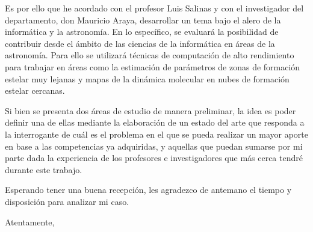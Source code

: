 \documentclass{letter} %
\begin{document}
\begin{letter}
\noindent Es por ello que he acordado con el profesor Luis Salinas y
con el investigador del departamento, don Mauricio Araya, desarrollar
un tema bajo el alero de la informática y la astronomía. En lo específico, se evaluará la posibilidad de contribuir desde el ámbito de las ciencias de la informática en áreas de la astronomía. Para ello se utilizará técnicas de computación de alto rendimiento para trabajar en áreas como la estimación de parámetros de zonas de formación estelar muy lejanas y mapas de la dinámica molecular en nubes de formación estelar cercanas.

Si bien se presenta dos áreas de estudio de manera preliminar, la idea es poder definir una de ellas mediante la elaboración de un estado del arte que responda a la interrogante de cuál es el problema en el que se pueda realizar un mayor aporte en base a las competencias ya adquiridas, y aquellas que puedan sumarse por mi parte dada la experiencia de los profesores e investigadores que más cerca tendré durante este trabajo.

Esperando tener una buena recepción, les agradezco de antemano el tiempo y disposición para analizar mi caso. 
 
\closing{Atentamente,} 
 

 

\end{letter}
 
\end{document}
